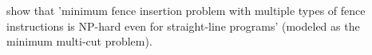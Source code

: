 \cite{meshman2014synthesis} show that 'minimum fence insertion problem with multiple types of fence instructions is NP-hard even for straight-line programs' (modeled as the minimum multi-cut problem).
